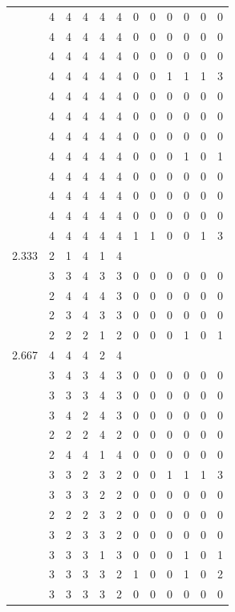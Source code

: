 \documentclass[]{book}
\theoremstyle{definition}
\theoremstyle{definition}
\theoremstyle{definition}
\theoremstyle{remark}
\begin{document}
\begin{table}
{\begin{tabular}[t]{rrrrrrrrrrrr}
 & 4 & 4 & 4 & 4 & 4 & 0 & 0 & 0 & 0 & 0 & 0\\
 & 4 & 4 & 4 & 4 & 4 & 0 & 0 & 0 & 0 & 0 & 0\\
 & 4 & 4 & 4 & 4 & 4 & 0 & 0 & 0 & 0 & 0 & 0\\
 & 4 & 4 & 4 & 4 & 4 & 0 & 0 & 1 & 1 & 1 & 3\\
 & 4 & 4 & 4 & 4 & 4 & 0 & 0 & 0 & 0 & 0 & 0\\
 & 4 & 4 & 4 & 4 & 4 & 0 & 0 & 0 & 0 & 0 & 0\\
 & 4 & 4 & 4 & 4 & 4 & 0 & 0 & 0 & 0 & 0 & 0\\
 & 4 & 4 & 4 & 4 & 4 & 0 & 0 & 0 & 1 & 0 & 1\\
 & 4 & 4 & 4 & 4 & 4 & 0 & 0 & 0 & 0 & 0 & 0\\
 & 4 & 4 & 4 & 4 & 4 & 0 & 0 & 0 & 0 & 0 & 0\\
 & 4 & 4 & 4 & 4 & 4 & 0 & 0 & 0 & 0 & 0 & 0\\
 & 4 & 4 & 4 & 4 & 4 & 1 & 1 & 0 & 0 & 1 & 3\\
2.333 & 2 & 1 & 4 & 1 & 4 &  &  &  &  &  & \\
 & 3 & 3 & 4 & 3 & 3 & 0 & 0 & 0 & 0 & 0 & 0\\
 & 2 & 4 & 4 & 4 & 3 & 0 & 0 & 0 & 0 & 0 & 0\\
 & 2 & 3 & 4 & 3 & 3 & 0 & 0 & 0 & 0 & 0 & 0\\
 & 2 & 2 & 2 & 1 & 2 & 0 & 0 & 0 & 1 & 0 & 1\\
2.667 & 4 & 4 & 4 & 2 & 4 &  &  &  &  &  & \\
 & 3 & 4 & 3 & 4 & 3 & 0 & 0 & 0 & 0 & 0 & 0\\
 & 3 & 3 & 3 & 4 & 3 & 0 & 0 & 0 & 0 & 0 & 0\\
 & 3 & 4 & 2 & 4 & 3 & 0 & 0 & 0 & 0 & 0 & 0\\
 & 2 & 2 & 2 & 4 & 2 & 0 & 0 & 0 & 0 & 0 & 0\\
 & 2 & 4 & 4 & 1 & 4 & 0 & 0 & 0 & 0 & 0 & 0\\
 & 3 & 3 & 2 & 3 & 2 & 0 & 0 & 1 & 1 & 1 & 3\\
 & 3 & 3 & 3 & 2 & 2 & 0 & 0 & 0 & 0 & 0 & 0\\
 & 2 & 2 & 2 & 3 & 2 & 0 & 0 & 0 & 0 & 0 & 0\\
 & 3 & 2 & 3 & 3 & 2 & 0 & 0 & 0 & 0 & 0 & 0\\
 & 3 & 3 & 3 & 1 & 3 & 0 & 0 & 0 & 1 & 0 & 1\\
 & 3 & 3 & 3 & 3 & 2 & 1 & 0 & 0 & 1 & 0 & 2\\
 & 3 & 3 & 3 & 3 & 2 & 0 & 0 & 0 & 0 & 0 & 0\\

\end{tabular}}
\end{table}
\end{document}
